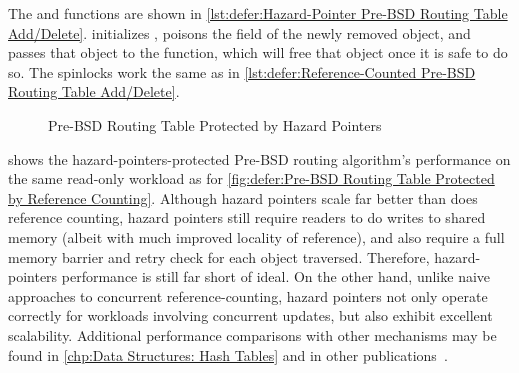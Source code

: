 \begin{fcvref}
The  and  functions are shown in
\cref{lst:defer:Hazard-Pointer Pre-BSD Routing Table Add/Delete}.
 initializes ,
 poisons the  field of the newly removed
object, and
 passes that object to the
 function, which will free that object once it
is safe to do so.
The spinlocks work the same as in
\cref{lst:defer:Reference-Counted Pre-BSD Routing Table Add/Delete}.
\end{fcvref}

\begin{figure}
\centering
{}
\caption{Pre-BSD Routing Table Protected by Hazard Pointers}
\label{fig:defer:Pre-BSD Routing Table Protected by Hazard Pointers}
\end{figure}

shows the hazard-pointers-protected Pre-BSD routing algorithm's
performance on the same read-only workload as for
\cref{fig:defer:Pre-BSD Routing Table Protected by Reference Counting}.
Although hazard pointers scale far better than does reference counting,
hazard pointers still require readers to do writes to shared
memory (albeit with much improved locality of reference),
and also require a full memory barrier and retry check for each
object traversed.
Therefore, hazard-pointers performance is still far short of ideal.
On the other hand, unlike naive approaches to concurrent
reference-counting, hazard pointers not only operate correctly for
workloads involving concurrent updates, but also exhibit excellent
scalability.
Additional performance comparisons with other mechanisms may be found in
\cref{chp:Data Structures: Hash Tables}
and in other publications~\cite{ThomasEHart2007a,McKenney:2013:SDS:2483852.2483867,MagedMichael04a}.

